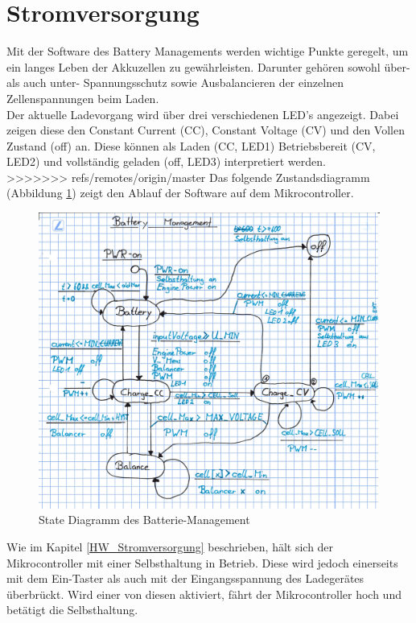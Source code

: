 \section{Stromversorgung} 
\label{SW_Stromversorgung}
Mit der Software des Battery Managements werden wichtige Punkte geregelt, um ein langes Leben der Akkuzellen zu gewährleisten. Darunter gehören sowohl über- als auch unter- Spannungsschutz sowie Ausbalancieren der einzelnen Zellenspannungen beim Laden. \\
Der aktuelle Ladevorgang wird über drei verschiedenen LED’s angezeigt. Dabei zeigen diese den Constant Current (CC), Constant Voltage (CV) und den Vollen Zustand (off) an. Diese können als Laden (CC, LED1) Betriebsbereit (CV, LED2) und vollständig geladen (off, LED3) interpretiert werden. \\
>>>>>>> refs/remotes/origin/master
Das folgende Zustandsdiagramm (Abbildung \ref{fig:statediagrammbatterie}) zeigt den Ablauf der Software auf dem Mikrocontroller.
\begin{figure} [H]
	\centering
	\includegraphics[width=1\linewidth]{images/Statediagramm_Batterie}
	\caption{State Diagramm des Batterie-Management}
	\label{fig:statediagrammbatterie}
\end{figure}
Wie im Kapitel \ref{HW_Stromversorgung} beschrieben, hält sich der Mikrocontroller mit einer Selbsthaltung in Betrieb. Diese wird jedoch einerseits mit dem Ein-Taster als auch mit der Eingangsspannung des Ladegerätes überbrückt. Wird einer von diesen aktiviert, fährt der Mikrocontroller hoch und betätigt die Selbsthaltung. \\
